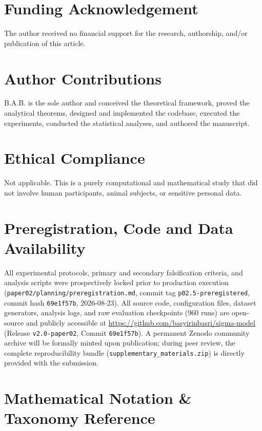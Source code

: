 \documentclass{article}
\theoremstyle{plain}
\theoremstyle{definition}
\begin{document}
\section*{Funding Acknowledgement}
The author received no financial support for the research, authorship, and/or publication of this article.

\section*{Author Contributions}
B.A.B. is the sole author and conceived the theoretical framework, proved the analytical theorems, designed and implemented the codebase, executed the experiments, conducted the statistical analyses, and authored the manuscript.

\section*{Ethical Compliance}
Not applicable. This is a purely computational and mathematical study that did not involve human participants, animal subjects, or sensitive personal data.

\section*{Preregistration, Code and Data Availability}
All experimental protocols, primary and secondary falsification criteria, and analysis scripts were prospectively locked prior to production execution (\texttt{paper02/planning/preregistration.md}, commit tag \texttt{p02.5-preregistered}, commit hash \texttt{69e1f57b}, 2026-08-23). All source code, configuration files, dataset generators, analysis logs, and raw evaluation checkpoints (960 runs) are open-source and publicly accessible at \url{https://github.com/basyirinbasri/sigma-model} (Release \texttt{v2.0-paper02}, Commit \texttt{69e1f57b}). A permanent Zenodo community archive will be formally minted upon publication; during peer review, the complete reproducibility bundle (\texttt{supplementary\_materials.zip}) is directly provided with the submission.



\newpage
\appendix

\section{Mathematical Notation \& Taxonomy Reference}
\label{sec:appendix_notation}
\end{document}
